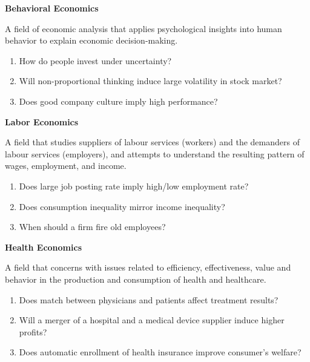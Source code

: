 \documentclass{beamer}
\let\olditem=\item%
\renewcommand{\item}{\olditem \justifying}%
\begin{document}
\begin{frame}{\bf Behavioral Economics}
\begin{definition}
A field of economic analysis that applies psychological insights into human behavior to explain economic decision-making.
\end{definition}
\begin{enumerate}
	\item How do people invest under uncertainty?
	\item Will non-proportional thinking induce large volatility in stock market?
	\item Does good company culture imply high performance?
\end{enumerate}
\end{frame}

\begin{frame}{\bf Labor Economics}
\begin{definition}
	A field that studies suppliers of labour services (workers) and the demanders of labour services (employers), and attempts to understand the resulting pattern of wages, employment, and income. 
\end{definition}
\begin{enumerate}
	\item Does large job posting rate imply high/low employment rate?
	\item Does consumption inequality mirror income inequality?
	\item When should a firm fire old employees?
\end{enumerate}
\end{frame}

\begin{frame}{\bf Health Economics}
\begin{definition}
	A field that concerns with issues related to efficiency, effectiveness, value and behavior in the production and consumption of health and healthcare.
\end{definition}
\begin{enumerate}
	\item Does match between physicians and patients affect treatment results?
	\item Will a merger of a hospital and a medical device supplier induce higher profits?
	\item Does automatic enrollment of health insurance improve consumer's welfare?
\end{enumerate}
\end{frame}
\end{document}
